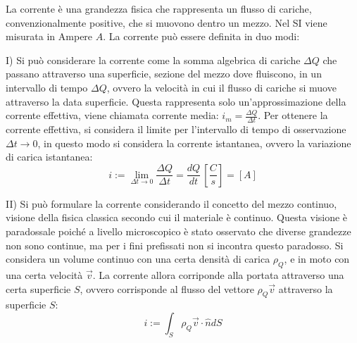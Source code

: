 \documentclass{article}
\numberwithin{equation}{subsection}
\begin{document}
La corrente è una grandezza fisica che rappresenta un flusso di cariche, convenzionalmente positive, che si muovono dentro un mezzo. Nel SI viene misurata in Ampere $A$. 
La corrente può essere definita in duo modi:  


I) Si può considerare la corrente come la somma algebrica di cariche $\Delta Q$ che passano attraverso una superficie, sezione del 
mezzo dove fluiscono, in un intervallo di tempo $\Delta Q$, ovvero la velocità in cui il flusso di cariche si muove attraverso la data superficie. Questa rappresenta solo 
un'approssimazione della corrente effettiva, viene chiamata corrente media: $i_m=\displaystyle\frac{\Delta Q}{\Delta t}$. Per ottenere la corrente effettiva, si considera il 
limite per l'intervallo di tempo di osservazione $\Delta t\to0$, in questo modo si considera la corrente istantanea, ovvero la variazione di carica istantanea:
\begin{equation}
    i:=\lim_{\Delta t\to0}\displaystyle\frac{\Delta Q}{\Delta t}=\frac{dQ}{dt}\,\left[\frac{C}{s}\right]=[A]
\end{equation}  

II) Si può formulare la corrente considerando il concetto del mezzo continuo, visione della fisica classica secondo cui il materiale è continuo. Questa visione è paradossale 
poiché a livello microscopico è stato osservato che diverse grandezze non sono continue, ma per i fini prefissati non si incontra questo paradosso. Si considera un volume 
continuo con una certa densità di carica $\rho_Q$, e in moto con una certa velocità $\vec{v}$. La corrente allora corriponde alla portata attraverso una certa superficie $S$, 
ovvero corrisponde al flusso del vettore $\rho_Q\vec{v}$ attraverso la superficie $S$: 
\begin{equation}
    i:=\displaystyle\int_S\rho_Q\vec{v}\cdot\hat{n}dS
\end{equation}

\begin{center}
\end{center}
\end{document}
